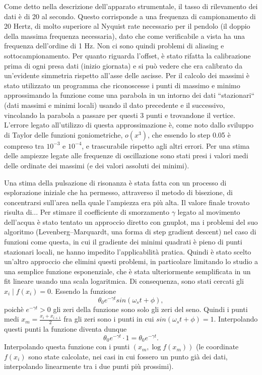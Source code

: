 Come detto nella descrizione dell'apparato strumentale, il tasso di rilevamento dei dati è di 20 al secondo. Questo corrisponde a una
frequenza di campionamento di 20 Hertz, di molto superiore al 
Nyquist rate necessario per il pendolo (il doppio della massima frequenza
necessaria), dato che come verificabile a vista ha una frequenza dell'ordine di 1 Hz. 
Non ci sono quindi problemi di aliasing e sottocampionamento.
Per quanto riguarda l'offset, è stato rifatta la calibrazione prima di ogni presa dati (inizio giornata) e si può vedere che era
 calibrato da un'evidente simmetria rispetto all'asse delle ascisse.
Per il calcolo dei massimi è stato utilizzato un programma che riconoscesse i punti di massimo e minimo approssimando
la funzione come una parabola in un intorno dei dati ``stazionari`` (dati massimi e minimi locali) usando il dato precedente e il successivo,
vincolando la parabola a passare per questi 3 punti e trovandone il vertice. L'errore legato all'utilizzo
 di questa approssimazione è, come noto dallo sviluppo di Taylor delle funzioni goniometriche, $o(x^3)$, che essendo lo step 0.05 è compreso tra $10^{-3}$ e $10^{-4}$,
  e trascurabile rispetto agli altri errori.
 Per una stima delle ampiezze legate alle frequenze di oscillazione sono stati presi i valori medi delle ordinate dei massimi (e dei valori assoluti dei minimi).

Una stima della pulsazione di risonanza è stata fatta con un processo di esplorazione iniziale che ha permesso, attraverso
il metodo di bisezione, di concentrarsi sull'area nella quale l'ampiezza era più alta. Il valore finale trovato risulta di...
Per stimare il coefficiente di smorzamento $\gamma$ legato al movimento dell'acqua è stato tentato un approccio diretto con gnuplot, ma i problemi del suo algoritmo 
(Levenberg–Marquardt, una forma di step gradient descent) nel caso di funzioni come questa, in cui il gradiente dei minimi quadrati è pieno di punti 
stazionari locali, ne hanno impedito l'applicabilità pratica. Quindi è stato scelto un'altro approccio che elimini questi problemi, in particolare limitando lo
studio a una semplice funzione esponenziale, che è stata ulteriormente semplificata in un fit lineare usando una scala logaritmica.
Di consequenza, sono stati cercati gli $x_i \mid f(x_i)=0$. Essendo la funzione
\begin{equation}
	\theta_0 e^{-\gamma t} sin(\omega_s t + \phi),
\end{equation}
poichè $e^{-\gamma t} > 0$ gli zeri della funzione sono solo gli zeri del seno. Quindi i punti medi 
$x_m = \frac{x_i + x_{i+1}}{2}$ fra gli zeri sono i punti in cui $sin(\omega_s t + \phi) = 1$.
Interpolando questi punti la funzione diventa dunque
\[
	\theta_0 e^{-\gamma t} \cdot 1 = \theta_0 e^{-\gamma t}.
\]
Interpolando questa funzione con i punti $(x_m,\log{f(x_m)})$ (le coordinate $f(x_i)$ sono state calcolate, nei casi in cui fossero un punto già dei dati,
interpolando linearmente tra i due punti più prossimi).

